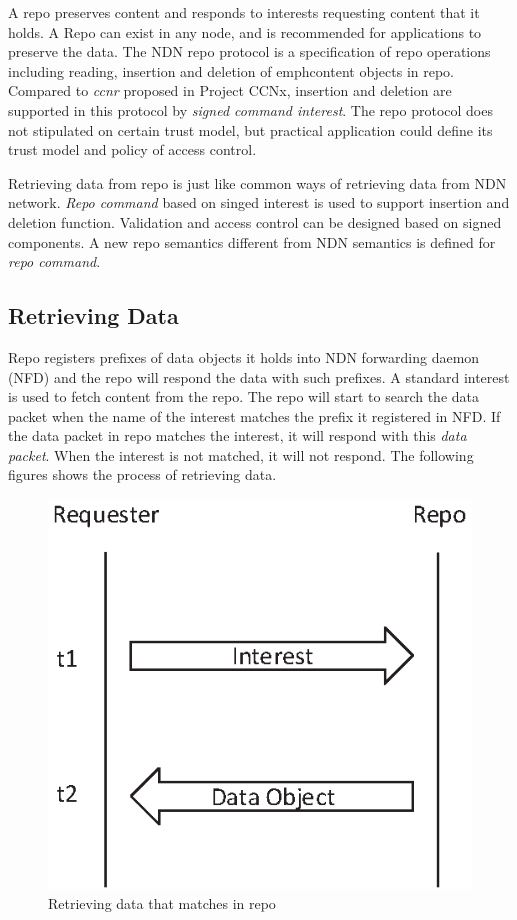 \documentclass{acm_proc_article-sp}
\begin{document}
A repo preserves content and responds to interests requesting content that it holds. A Repo can exist in any node, and is recommended for applications to preserve the data. The NDN repo protocol is a specification of repo operations including reading, insertion and deletion of emph{content objects} in repo. Compared to \emph{ccnr} proposed in Project CCNx, insertion and deletion are supported in this protocol by \emph{signed command interest}. The repo protocol does not stipulated on certain trust model, but practical application could define its trust model and policy of access control.

Retrieving data from repo is just like common ways of retrieving data from NDN network. \emph{Repo command} based on singed interest is used to support insertion and deletion function. Validation and access control can be designed based on signed components. A new repo semantics different from NDN semantics is defined for \emph{repo command}.

\subsection{Retrieving Data}

  Repo registers prefixes of data objects it holds into NDN forwarding daemon (NFD) and the repo will respond the data with such prefixes. A standard interest is used to fetch content from the repo. The repo will start to search the data packet when the name of the interest matches the prefix it registered in NFD. If the data packet in repo matches the interest, it will respond with this \emph{data packet}. When the interest is not matched, it will not respond. The following figures shows the process of retrieving data.

\begin{figure}
\centering
\includegraphics{Drawing1.eps}
\caption{Retrieving data that matches in repo}
\end{figure}
\end{document}
